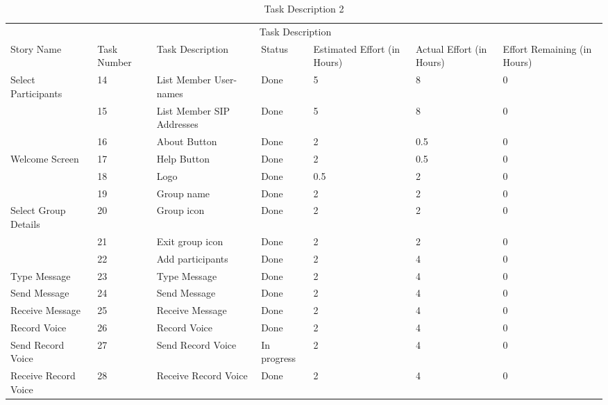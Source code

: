 \documentclass[a4paper]{article}
\begin{document}
\pagebreak
 

\begin{table} 
\begin{tabular}{p{3cm} p{1cm} p{3.5cm} p{1cm} p{1cm} p{1cm} p{1cm}} 
\hline %
& \multicolumn{5}{c}{Task Description} \\
\cmidrule(l){2-7}
Story Name & Task Number & Task Description & Status & Estimated Effort (in Hours) & Actual Effort (in Hours) & Effort Remaining (in Hours)\\ %
\hline

Select Participants & 14 & List Member User-names & Done & 5 & 8 & 0\\ \cmidrule(l){2-6}

 & 15 & List Member SIP Addresses & Done & 5 & 8 & 0\\ 
\midrule

& 16 & About Button & Done & 2 & 0.5 & 0\\ \cmidrule(l){2-6}

Welcome Screen & 17 & Help Button & Done & 2 & 0.5 & 0\\ \cmidrule(l){2-6}

& 18 & Logo & Done & 0.5 & 2 & 0\\ 
\midrule

 & 19 & Group name & Done & 2 & 2 & 0\\\cmidrule(l){2-6}

Select Group Details &  20  & Group icon & Done & 2 & 2 & 0\\\cmidrule(l){2-6}

 & 21 & Exit group icon & Done & 2 & 2 & 0\\\cmidrule(l){2-6}

 & 22 & Add participants & Done & 2 & 4 & 0\\ 
 \midrule

Type Message & 23 & Type Message & Done & 2 & 4 & 0\\ 
 \midrule
 
 Send Message & 24 & Send Message & Done & 2 & 4 & 0\\ 
 \midrule
 
 Receive Message & 25 & Receive Message & Done & 2 & 4 & 0\\ 
 \midrule
 
 Record Voice & 26 & Record Voice & Done & 2 & 4 & 0\\ 
 \midrule
 
 Send Record Voice & 27 & Send Record Voice & In progress & 2 & 4 & 0\\ 
 \midrule
 
 Receive Record Voice & 28 & Receive Record Voice & Done & 2 & 4 & 0\\ 
\hline
\end{tabular}
\caption{Task Description 2} %
\label{tab:template} %
\end{table}
\end{document}

